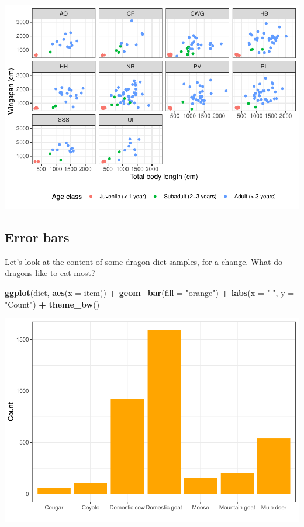 \documentclass[
]{book}
\newenvironment{Shaded}{\begin{snugshade}}{\end{snugshade}}
\newcommand{\AttributeTok}[1]{\textcolor[rgb]{0.13,0.29,0.53}{#1}}
\newcommand{\FunctionTok}[1]{\textcolor[rgb]{0.13,0.29,0.53}{\textbf{#1}}}
\newcommand{\NormalTok}[1]{#1}
\newcommand{\SpecialCharTok}[1]{\textcolor[rgb]{0.81,0.36,0.00}{\textbf{#1}}}
\newcommand{\StringTok}[1]{\textcolor[rgb]{0.31,0.60,0.02}{#1}}
\begin{document}
\includegraphics{reproducible-science_files/figure-latex/gg23-1.pdf}

\hypertarget{error-bars}{%
\subsection{Error bars}\label{error-bars}}

Let's look at the content of some dragon diet samples, for a change. What do
dragons like to eat most?

\begin{Shaded}
\begin{Highlighting}[]
\FunctionTok{ggplot}\NormalTok{(diet, }\FunctionTok{aes}\NormalTok{(}\AttributeTok{x =}\NormalTok{ item)) }\SpecialCharTok{+}
  \FunctionTok{geom\_bar}\NormalTok{(}\AttributeTok{fill =} \StringTok{"orange"}\NormalTok{) }\SpecialCharTok{+} 
  \FunctionTok{labs}\NormalTok{(}\AttributeTok{x =} \StringTok{" "}\NormalTok{, }\AttributeTok{y =} \StringTok{"Count"}\NormalTok{) }\SpecialCharTok{+}
  \FunctionTok{theme\_bw}\NormalTok{()}
\end{Highlighting}
\end{Shaded}

\includegraphics{reproducible-science_files/figure-latex/gg24-1.pdf}
\end{document}
